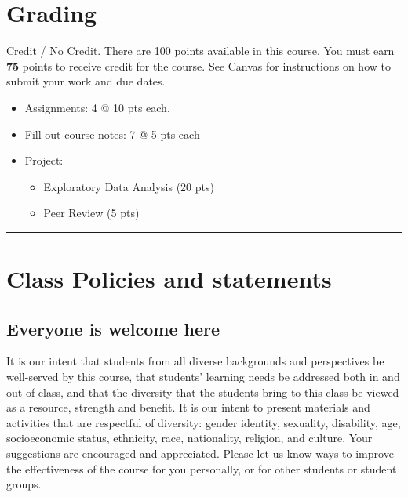 \documentclass[
  11pt,
]{article}
\providecommand{\tightlist}{%
  \setlength{\itemsep}{0pt}\setlength{\parskip}{0pt}}
\begin{document}
\section{Grading}\label{grading}

Credit / No Credit. There are 100 points available in this course. You
must earn \textbf{75} points to receive credit for the course. See
Canvas for instructions on how to submit your work and due dates.

\begin{itemize}
\tightlist
\item
  Assignments: 4 @ 10 pts each.
\item
  Fill out course notes: 7 @ 5 pts each
\item
  Project:

  \begin{itemize}
  \tightlist
  \item
    Exploratory Data Analysis (20 pts)
  \item
    Peer Review (5 pts)
  \end{itemize}
\end{itemize}

\begin{center}\rule{0.5\linewidth}{0.5pt}\end{center}

\section{Class Policies and
statements}\label{class-policies-and-statements}

\subsection{Everyone is welcome here}\label{everyone-is-welcome-here}

It is our intent that students from all diverse backgrounds and
perspectives be well-served by this course, that students' learning
needs be addressed both in and out of class, and that the diversity that
the students bring to this class be viewed as a resource, strength and
benefit. It is our intent to present materials and activities that are
respectful of diversity: gender identity, sexuality, disability, age,
socioeconomic status, ethnicity, race, nationality, religion, and
culture. Your suggestions are encouraged and appreciated. Please let us
know ways to improve the effectiveness of the course for you personally,
or for other students or student groups.
\end{document}
